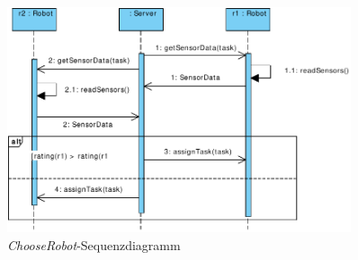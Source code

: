 \begin{figure}[H]
	\centering
	\includegraphics[width=0.9\textwidth]{img/0-Entwurf-2-ChooseRob}
	\caption{\emph{ChooseRobot}-Sequenzdiagramm}
	\label{SequenzDiagrammInteraktion}
\end{figure}
